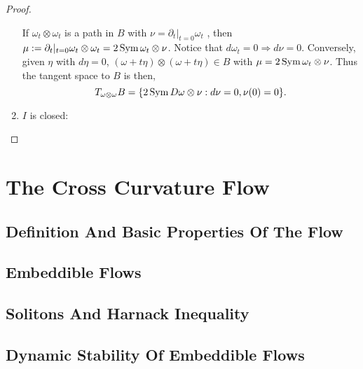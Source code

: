 \documentclass[a4paper, 12pt]{amsart}
\begin{document}
\begin{proof}
\begin{enumerate}
If \(\omega_t \otimes \omega_t\) is a path in \(B\) with \(\nu = \partial_t|_{t=0} \omega_t\) , then \(\mu := \partial_t|_{t=0} \omega_t \otimes \omega_t = 2 \operatorname{Sym} \omega_t \otimes \nu\). Notice that \(d\omega_t = 0 \Rightarrow d\nu = 0\). Conversely, given \(\eta\) with \(d \eta = 0\), \((\omega + t \eta) \otimes (\omega + t \eta) \in B\) with \(\mu =  2 \operatorname{Sym} \omega_t \otimes \nu\). Thus the tangent space to \(B\) is then,
\[
T_{\omega \otimes \omega} B = \{2 \operatorname{Sym} D\omega \otimes \nu : d\nu = 0, \nu(0) = 0\}.
\]

\item \(I\) is closed:


\end{enumerate}
\end{proof}

\section{The Cross Curvature Flow}
\label{sec:xcf}

\subsection{Definition And Basic Properties Of  The Flow}
\label{subsec:xcf_defn}

\subsection{Embeddible Flows}
\label{subsec:xcf_embeddible}

\subsection{Solitons And Harnack Inequality}
\label{subsec:xcf_solitions_harnack}
\subsection{Dynamic Stability Of Embeddible Flows}
\label{subsec:xcf_dynamic}

\printbibliography
\end{document}
